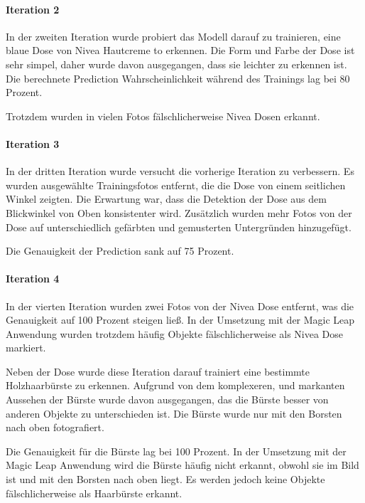 \paragraph{Iteration 2}

In der zweiten Iteration wurde probiert das Modell darauf zu trainieren, eine blaue Dose von Nivea Hautcreme to erkennen. Die Form und Farbe der Dose ist sehr simpel, daher wurde davon ausgegangen, dass sie leichter zu erkennen ist. Die berechnete Prediction Wahrscheinlichkeit während des Trainings lag bei 80 Prozent.

Trotzdem wurden in vielen Fotos fälschlicherweise Nivea Dosen erkannt. 

\paragraph{Iteration 3}

In der dritten Iteration wurde versucht die vorherige Iteration zu verbessern. Es wurden ausgewählte Trainingsfotos entfernt, die die Dose von einem seitlichen Winkel zeigten. Die Erwartung war, dass die Detektion der Dose aus dem Blickwinkel von Oben konsistenter wird. Zusätzlich wurden mehr Fotos von der Dose auf unterschiedlich gefärbten und gemusterten Untergründen hinzugefügt. 

Die Genauigkeit der Prediction sank auf 75 Prozent.

\paragraph{Iteration 4}

In der vierten Iteration wurden zwei Fotos von der Nivea Dose entfernt, was die Genauigkeit auf 100 Prozent steigen ließ. In der Umsetzung mit der Magic Leap Anwendung wurden trotzdem häufig Objekte fälschlicherweise als Nivea Dose markiert.

Neben der Dose wurde diese Iteration darauf trainiert eine bestimmte Holzhaarbürste zu erkennen. Aufgrund von dem komplexeren, und markanten Aussehen der Bürste wurde davon ausgegangen, das die Bürste besser von anderen Objekte zu unterschieden ist. 
Die Bürste wurde nur mit den Borsten nach oben fotografiert.

Die Genauigkeit für die Bürste lag bei 100 Prozent. 
In der Umsetzung mit der Magic Leap Anwendung wird die Bürste häufig nicht erkannt, obwohl sie im Bild ist und mit den Borsten nach oben liegt. Es werden jedoch keine Objekte fälschlicherweise als Haarbürste erkannt.

